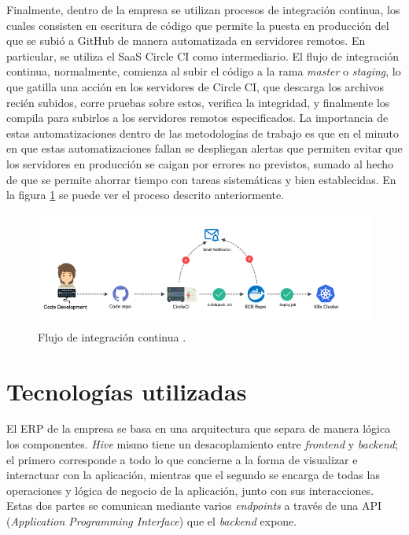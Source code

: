     Finalmente, dentro de la empresa se utilizan procesos de integración continua, los cuales consisten en escritura de código que permite la puesta en producción del que se subió a GitHub de manera automatizada en servidores remotos. En particular, se utiliza el SaaS Circle CI como intermediario. El flujo de integración continua, normalmente, comienza al subir el código a la rama \textit{master} o \textit{staging}, lo que gatilla una acción en los servidores de Circle CI, que descarga los archivos recién subidos, corre pruebas sobre estos, verifica la integridad, y finalmente los compila para subirlos a los servidores remotos especificados. La importancia de estas automatizaciones dentro de las metodologías de trabajo es que en el minuto en que estas automatizaciones fallan se despliegan alertas que permiten evitar que los servidores en producción se caigan por errores no previstos, sumado al hecho de que se permite ahorrar tiempo con tareas sistemáticas y bien establecidas. En la figura \ref{fig:continuous_integration} se puede ver el proceso descrito anteriormente.
    
    \begin{figure}
        \centering
        \includegraphics[width=0.9\linewidth]{figures/continuous_integration.png}
        \caption{Flujo de integración continua \protect\cite{continuous_integration}.}
        \label{fig:continuous_integration}
    \end{figure}

\section{Tecnologías utilizadas}

    El ERP de la empresa se basa en una arquitectura que separa de manera lógica los componentes. \textit{Hive} mismo tiene un desacoplamiento entre \textit{frontend} y \textit{backend}; el primero corresponde a todo lo que concierne a la forma de visualizar e interactuar con la aplicación, mientras que el segundo se encarga de todas las operaciones y lógica de negocio de la aplicación, junto con sus interacciones. Estas dos partes se comunican mediante varios \textit{endpoints} a través de una API (\textit{Application Programming Interface}) que el \textit{backend} expone. 
    
